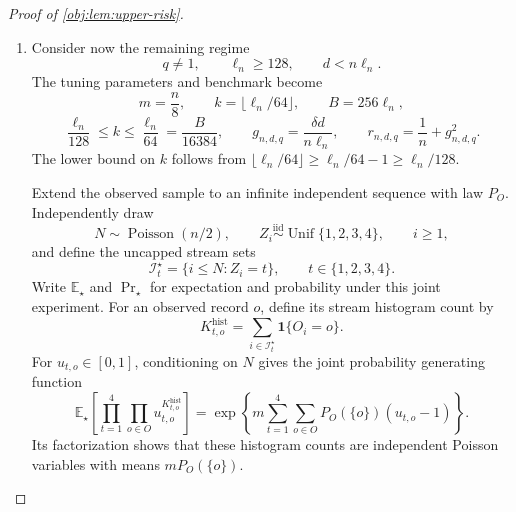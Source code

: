 \documentclass[11pt]{article}
\begin{document}
\begin{proof}[Proof of \cref{obj:lem:upper-risk}]
\begin{enumerate}
\item Consider now the remaining regime
\[
q\ne1,\qquad \ell_n\ge128,\qquad d<n\ell_n.
\]
The tuning parameters and benchmark become
\[
m=\frac n8,\qquad
k=\lfloor\ell_n/64\rfloor,\qquad
B=256\ell_n,
\]
\[
\frac{\ell_n}{128}\le k\le\frac{\ell_n}{64}
=\frac{B}{16384},
\qquad
g_{n,d,q}=\frac{\delta d}{n\ell_n},
\qquad
r_{n,d,q}=\frac1n+g_{n,d,q}^2.
\]
The lower bound on \(k\) follows from
\(\lfloor\ell_n/64\rfloor\ge\ell_n/64-1\ge\ell_n/128\).

Extend the observed sample to an infinite independent sequence with law \(P_O\). Independently draw
\[
N\sim\operatorname{Poisson}(n/2),
\qquad
Z_i\stackrel{\mathrm{iid}}{\sim}\operatorname{Unif}\{1,2,3,4\},
\qquad i\ge1,
\]
and define the uncapped stream sets
\[
\mathcal I_t^\star=\{i\le N:Z_i=t\},
\qquad t\in\{1,2,3,4\}.
\]
Write \(\mathbb E_\star\) and \(\Pr_\star\) for expectation and probability under this joint experiment. For an observed record \(o\), define its stream histogram count by
\[
K_{t,o}^{\mathrm{hist}}
=\sum_{i\in\mathcal I_t^\star}\mathbf1\{O_i=o\}.
\]
For \(u_{t,o}\in[0,1]\), conditioning on \(N\) gives the joint probability generating function
\[
\mathbb E_\star\!\left[
\prod_{t=1}^4\prod_{o\in O}
u_{t,o}^{K_{t,o}^{\mathrm{hist}}}\right]
=
\exp\!\left\{
m\sum_{t=1}^4\sum_{o\in O}P_O(\{o\})(u_{t,o}-1)
\right\}.
\]
Its factorization shows that these histogram counts are independent Poisson variables with means \(mP_O(\{o\})\).


\end{enumerate}
\end{proof}
\end{document}
